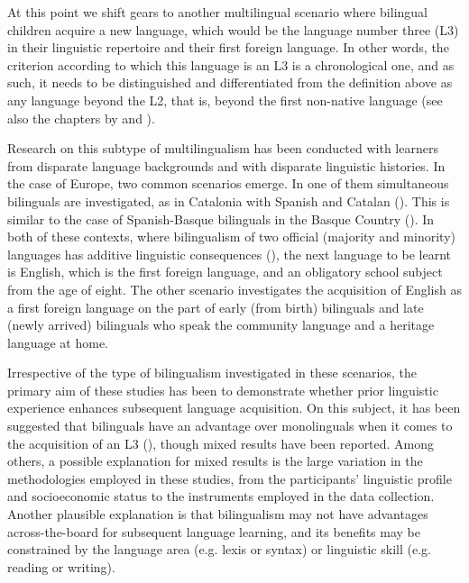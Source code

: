 \documentclass[output=paper,colorlinks,citecolor=brown,nonflat]{langsci/langscibook}
\begin{document}
At this point we shift gears to another multilingual scenario where bilingual children acquire a new language, which would be the language number three (L3) in their linguistic repertoire and their first foreign language. In other words, the criterion according to which this language is an L3 is a chronological one, and as such, it needs to be distinguished and differentiated from the definition above as any language beyond the L2, that is, beyond the first non-native language (see also the chapters by \citeauthor{chapters/munoz} and ).

Research on this subtype of multilingualism has been conducted with learners from disparate language backgrounds and with disparate linguistic histories. In the case of Europe, two common scenarios emerge. In one of them simultaneous bilinguals are investigated, as in Catalonia with Spanish and Catalan (\citealt{Muñoz2000, Muñoz2000}). This is similar to the case of Spanish-Basque bilinguals in the Basque Country (\citealt{García-MayoGarcía-Lecumberri2003}). In both of these contexts, where bilingualism of two official (majority and minority) languages has additive linguistic consequences (\citealt{CenozValencia1994, Sanz2000}), the next language to be learnt is English, which is the first foreign language, and an obligatory school subject from the age of eight. The other scenario investigates the acquisition of English as a first foreign language on the part of early (from birth) bilinguals and late (newly arrived) bilinguals who speak the community language and a heritage language at home.

Irrespective of the type of bilingualism investigated in these scenarios, the primary aim of these studies has been to demonstrate whether prior linguistic experience enhances subsequent language acquisition. On this subject, it has been suggested that bilinguals have an advantage over monolinguals when it comes to the acquisition of an L3 (\citealt{Sanz2000, Cenoz2003, Cenoz2013, Kopečková2016, HiroshiDegani2018}), though mixed results have been reported. Among others, a possible explanation for mixed results is the large variation in the methodologies employed in these studies, from the participants’ linguistic profile and socioeconomic status to the instruments employed in the data collection. Another plausible explanation is that bilingualism may not have advantages across-the-board for subsequent language learning, and its benefits may be constrained by the language area (e.g. lexis or syntax) or linguistic skill (e.g. reading or writing).
\end{document}
